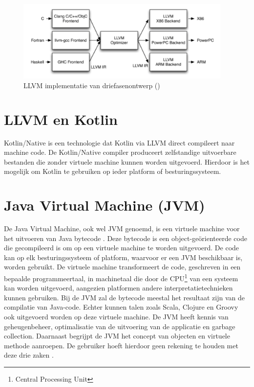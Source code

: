 \begin{figure} [ht]
	\centering
	\includegraphics[width=0.95\textwidth]{img/llvmirdriefasen}
	\caption{LLVM implementatie van driefasenontwerp (\cite{aosa})}
	\label{fig:llvmirdriefasen}
\end{figure}

\section{LLVM en Kotlin}
Kotlin/Native is een technologie dat Kotlin via LLVM direct compileert naar machine code. De Kotlin/Native compiler produceert zelfstandige uitvoerbare bestanden die zonder virtuele machine kunnen worden uitgevoerd. Hierdoor is het mogelijk om Kotlin te gebruiken op ieder platform of besturingssysteem.

\section{Java Virtual Machine (JVM)}
\label{sec:jvm}
De Java Virtual Machine, ook wel JVM genoemd, is een virtuele machine voor het uitvoeren van Java bytecode \autocite{TechopediaBytecode}. Deze bytecode is een object-geörienteerde code die gecompileerd is om op een virtuele machine te worden uitgevoerd. De code kan op elk besturingssysteem of platform, waarvoor er een JVM beschikbaar is, worden gebruikt. De virtuele machine transformeert de code, geschreven in een bepaalde programmeertaal, in machinetaal die door de CPU\footnote{Central Processing Unit} van een systeem kan worden uitgevoerd, aangezien platformen andere interpretatietechnieken kunnen gebruiken. Bij de JVM zal de bytecode meestal het resultaat zijn van de compilatie van Java-code. Echter kunnen talen zoals Scala, Clojure en Groovy ook uitgevoerd worden op deze virtuele machine. De JVM heeft kennis van geheugenbeheer, optimalisatie van de uitvoering van de applicatie en garbage collection. Daarnaast begrijpt de JVM het concept van objecten en virtuele methode aanroepen. De gebruiker hoeft hierdoor geen rekening te houden met deze drie zaken \autocite{TechopediaJVM}. 

